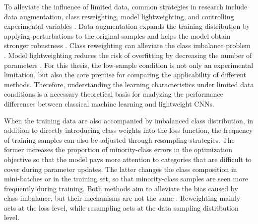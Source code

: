 \par To alleviate the influence of limited data, common strategies in research
include data augmentation, class reweighting, model lightweighting, and
controlling experimental variables
\cite{shorten2019survey,he2009learning}. Data augmentation
expands the training distribution by applying perturbations to the original
samples and helps the model obtain stronger robustness \cite{shorten2019survey}.
Class reweighting can alleviate the class imbalance problem
\cite{he2009learning}. Model lightweighting reduces the risk of overfitting by
decreasing the number of parameters \cite{howard2017mobilenets}. For this
thesis, the low-sample condition is not only an experimental limitation, but
also the core premise for comparing the applicability of different methods.
Therefore, understanding the learning characteristics under limited data
conditions is a necessary theoretical basis for analyzing the performance
differences between classical machine learning and lightweight CNNs.

\par When the training data are also accompanied by imbalanced class
distribution, in addition to directly introducing class weights into the loss
function, the frequency of training samples can also be adjusted through
resampling strategies. The former increases the proportion of minority-class
errors in the optimization objective so that the model pays more attention to
categories that are difficult to cover during parameter updates. The latter
changes the class composition in mini-batches or in the training set, so that
minority-class samples are seen more frequently during training. Both methods
aim to alleviate the bias caused by class imbalance, but their mechanisms are
not the same \cite{Cui_2019_CVPR,buda2018systematic}. Reweighting mainly acts at
the loss level, while resampling acts at the data sampling distribution level.

